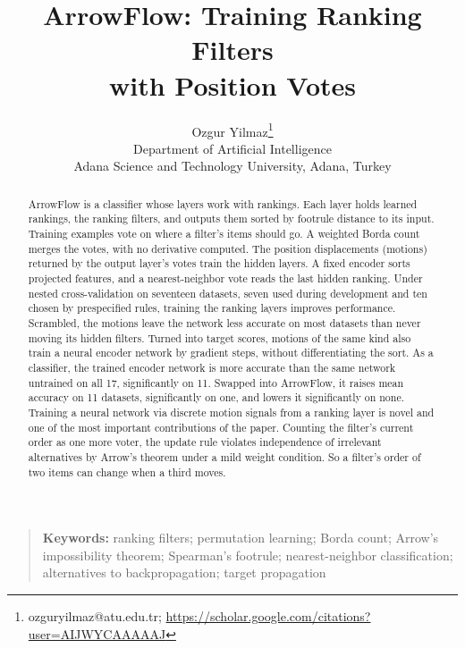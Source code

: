 \documentclass[12pt]{article}
\begin{document}
\title{ArrowFlow: Training Ranking Filters\\with Position Votes}
\author{Ozgur Yilmaz\footnote{ozguryilmaz@atu.edu.tr; \url{https://scholar.google.com/citations?user=AIJWYCAAAAAJ}} \\
\small Department of Artificial Intelligence\\
\small Adana Science and Technology University, Adana, Turkey}
\date{}
\maketitle

\begin{abstract}
ArrowFlow is a classifier whose layers work with rankings. Each layer holds learned rankings, the ranking filters, and outputs them sorted by footrule distance to its input. Training examples vote on where a filter's items should go. A weighted Borda count merges the votes, with no derivative computed. The position displacements (motions) returned by the output layer's votes train the hidden layers. A fixed encoder sorts projected features, and a nearest-neighbor vote reads the last hidden ranking. Under nested cross-validation on seventeen datasets, seven used during development and ten chosen by prespecified rules, training the ranking layers improves performance. Scrambled, the motions leave the network less accurate on most datasets than never moving its hidden filters. Turned into target scores, motions of the same kind also train a neural encoder network by gradient steps, without differentiating the sort. As a classifier, the trained encoder network is more accurate than the same network untrained on all 17, significantly on 11. Swapped into ArrowFlow, it raises mean accuracy on 11 datasets, significantly on one, and lowers it significantly on none. Training a neural network via discrete motion signals from a ranking layer is novel and one of the most important contributions of the paper. Counting the filter's current order as one more voter, the update rule violates independence of irrelevant alternatives by Arrow's theorem under a mild weight condition. So a filter's order of two items can change when a third moves.
\end{abstract}
\begin{quote}\small\noindent\textbf{Keywords:} ranking filters; permutation learning; Borda count; Arrow's impossibility theorem; Spearman's footrule; nearest-neighbor classification; alternatives to backpropagation; target propagation\end{quote}
\end{document}
